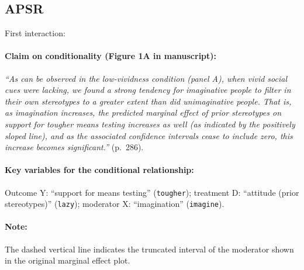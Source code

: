 \documentclass[12pt]{article}
\begin{document}
\clearpage


\subsection{\citet{Petersen2013} APSR} \label{petersen}

\noindent First interaction:

\paragraph{Claim on conditionality (Figure 1A in manuscript):} \emph{``As can be observed in the low-vividness condition (panel A), when vivid social cues were lacking, we found a strong tendency for imaginative people to filter in their own stereotypes to a greater extent than did unimaginative people. That is, as imagination increases, the predicted marginal effect of prior stereotypes on support for tougher means testing increases as well (as indicated by the positively sloped line), and as the associated confidence intervals cease to include zero, this increase becomes significant.''} (p.\ 286). 



\paragraph{Key variables for the conditional relationship:} Outcome Y:
``support for means testing'' (\texttt{tougher}); treatment D: ``attitude (prior stereotypes)'' (\texttt{lazy}); moderator X: ``imagination''
(\texttt{imagine}).

\paragraph{Note:}  The dashed vertical line indicates the truncated interval of the moderator shown in the original marginal effect plot.


\newpage
\end{document}
